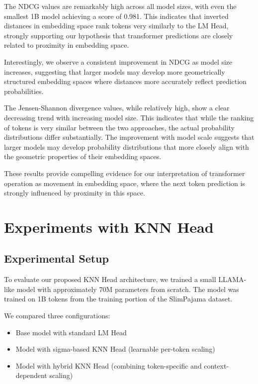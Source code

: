 The NDCG values are remarkably high across all model sizes, with even the smallest 1B model achieving a score of 0.981. This indicates that inverted distances in embedding space rank tokens very similarly to the LM Head, strongly supporting our hypothesis that transformer predictions are closely related to proximity in embedding space.

Interestingly, we observe a consistent improvement in NDCG as model size increases, suggesting that larger models may develop more geometrically structured embedding spaces where distances more accurately reflect prediction probabilities.

The Jensen-Shannon divergence values, while relatively high, show a clear decreasing trend with increasing model size. This indicates that while the ranking of tokens is very similar between the two approaches, the actual probability distributions differ substantially. The improvement with model scale suggests that larger models may develop probability distributions that more closely align with the geometric properties of their embedding spaces.

These results provide compelling evidence for our interpretation of transformer operation as movement in embedding space, where the next token prediction is strongly influenced by proximity in this space.

\section{Experiments with KNN Head}

\subsection{Experimental Setup}

To evaluate our proposed KNN Head architecture, we trained a small LLAMA-like model with approximately 70M parameters from scratch. The model was trained on 1B tokens from the training portion of the SlimPajama dataset.

We compared three configurations:
\begin{itemize}
    \item Base model with standard LM Head
    \item Model with sigma-based KNN Head (learnable per-token scaling)
    \item Model with hybrid KNN Head (combining token-specific and context-dependent scaling)
\end{itemize}

